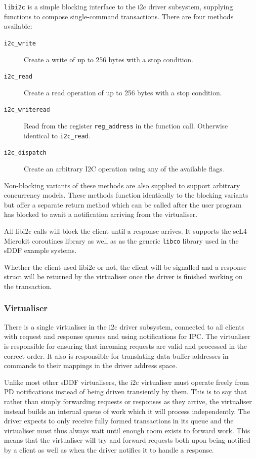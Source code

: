 \documentclass[a4paper,12pt]{report}
\newcommand{\code}[1]{\texttt{#1}}
\begin{document}
\texttt{libi2c} is a simple blocking interface to the \gls{i2c} driver subsystem, supplying
functions to compose single-command transactions. There are four methods available:

\begin{description}
  \item[\code{i2c\_write}] Create a write of up to 256 bytes with a stop condition.
  \item[\code{i2c\_read}] Create a read operation of up to 256 bytes with a stop condition.
  \item[\code{i2c\_writeread}] Read from the register \code{reg\_address} in the function call.
    Otherwise identical to \code{i2c\_read}.
  \item[\code{i2c\_dispatch}] Create an arbitrary I2C operation using any of the available flags.
\end{description}

Non-blocking variants of these methods are also supplied to support arbitrary concurrency models.
These methods function identically to the blocking variants but offer a separate return method which
can be called after the user program has blocked to await a notification arriving from the virtualiser.

All libi2c calls will block the client until a response arrives. It supports the
seL4 Microkit coroutines library as well as as the generic \texttt{libco} library used in
the sDDF example systems.

Whether the client used libi2c or not, the client will be signalled and a response struct
will be returned by the virtualiser once the driver is finished working on the transaction.

\subsubsection{Virtualiser}

There is a single virtualiser in the \gls{i2c} driver subsystem, connected to all clients
with request and response queues and using notifications for IPC. The virtualiser is
responsible for ensuring that incoming requests are valid and processed in the correct order.
It also is responsible for translating data buffer addresses in commands to their
mappings in the driver address space.

Unlike most other sDDF virtualisers, the \gls{i2c} virtualiser must operate freely
from PD notifications instead of being driven transiently by them. This is to say that
rather than simply forwarding requests or responses as they arrive, the virtualiser instead
builds an internal queue of work which it will process independently. The driver expects to
only receive fully formed transactions in its queue and the virtualiser must thus always wait
until enough room exists to forward work. This means that the virtualiser will try and forward
requests both upon being notified by a client as well as when the driver notifies it to handle
a response.
\end{document}
